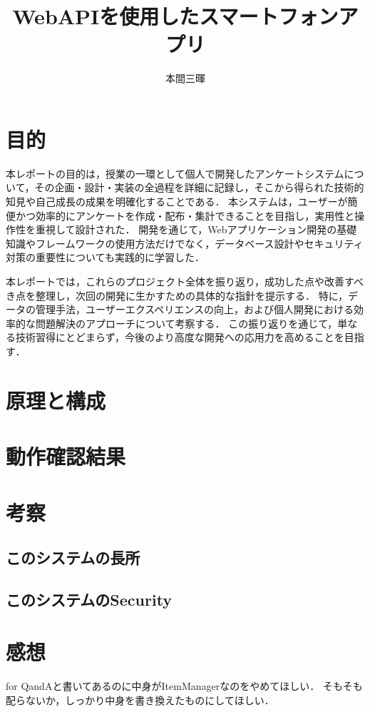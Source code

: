 \documentclass[titlepage,a4paper]{jsarticle}
\title{WebAPIを使用したスマートフォンアプリ}
\author{本間三暉}
\begin{document}
\maketitle

\section{目的}
本レポートの目的は，授業の一環として個人で開発したアンケートシステムについて，その企画・設計・実装の全過程を詳細に記録し，そこから得られた技術的知見や自己成長の成果を明確化することである．
本システムは，ユーザーが簡便かつ効率的にアンケートを作成・配布・集計できることを目指し，実用性と操作性を重視して設計された．
開発を通じて，Webアプリケーション開発の基礎知識やフレームワークの使用方法だけでなく，データベース設計やセキュリティ対策の重要性についても実践的に学習した．

本レポートでは，これらのプロジェクト全体を振り返り，成功した点や改善すべき点を整理し，次回の開発に生かすための具体的な指針を提示する．
特に，データの管理手法，ユーザーエクスペリエンスの向上，および個人開発における効率的な問題解決のアプローチについて考察する．
この振り返りを通じて，単なる技術習得にとどまらず，今後のより高度な開発への応用力を高めることを目指す．
\section{原理と構成}

\section{動作確認結果}

\section{考察}
\subsection{このシステムの長所}


\subsection{このシステムのSecurity}

\section{感想}
for QandAと書いてあるのに中身がItemManagerなのをやめてほしい．
そもそも配らないか，しっかり中身を書き換えたものにしてほしい．

\begin{thebibliography}{99}
  \bibitem{}
\end{thebibliography}
\end{document}
